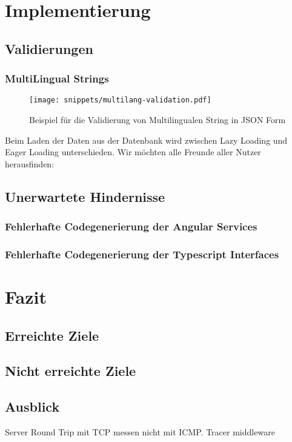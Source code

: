 \chapter{Implementierung}

\section{Validierungen}
\subsection{MultiLingual Strings}
\begin{figure}[h!]
	\centering
	\texttt{[image: snippets/multilang-validation.pdf]}
	\caption{Beispiel für die Validierung von Multilingualen String in JSON Form}
	\label{req:typesafe:example}
\end{figure}

Beim Laden der Daten aus der Datenbank wird zwischen Lazy Loading und Eager Loading unterschieden. Wir möchten alle Freunde aller Nutzer herausfinden:

\section{Unerwartete Hindernisse}
\subsection{Fehlerhafte Codegenerierung der Angular Services}
\subsection{Fehlerhafte Codegenerierung der Typescript Interfaces}

\chapter{Fazit}
\section{Erreichte Ziele}
\section{Nicht erreichte Ziele}
\section{Ausblick}
Server Round Trip mit TCP messen nicht mit ICMP. Tracer middleware
